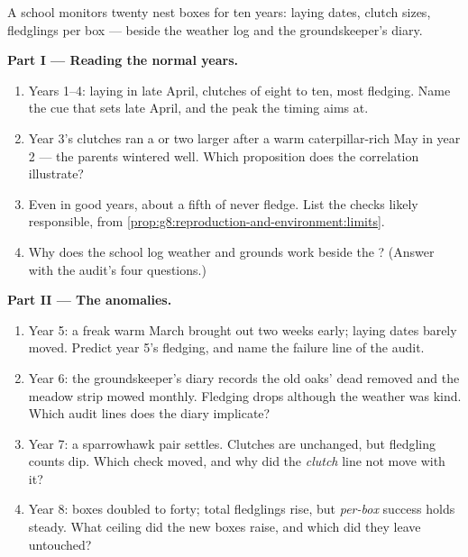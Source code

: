 \begin{problem}\label{pb:g8:reproduction-and-environment:1}
A school monitors twenty nest boxes for ten years:
laying dates, clutch sizes, fledglings per box --- beside
the weather log and the groundskeeper's diary.

\medskip\noindent\textbf{Part I --- Reading the normal
years.}
\begin{enumerate}
  \item Years 1--4: laying in late April, clutches of
        eight to ten, most  fledging. Name the cue
        that sets late April, and the peak the timing
        aims at.
  \item Year 3's clutches ran a  or two larger after a
        warm caterpillar-rich May in year 2 --- the
        parents wintered well. Which proposition does the
        correlation illustrate?
  \item Even in good years, about a fifth of  never
        fledge. List the checks likely responsible, from
        \cref{prop:g8:reproduction-and-environment:limits}.
  \item Why does the school log weather and grounds work
        beside the ? (Answer with the audit's four
        questions.)
\end{enumerate}

\medskip\noindent\textbf{Part II --- The anomalies.}
\begin{enumerate}[resume]
  \item Year 5: a freak warm March brought 
        out two weeks early; laying dates barely moved.
        Predict year 5's fledging, and name the failure
        line of the audit.
  \item Year 6: the groundskeeper's diary records the old
        oaks' dead  removed and the meadow strip
        mowed monthly. Fledging drops although the
        weather was kind. Which audit lines does the
        diary implicate?
  \item Year 7: a sparrowhawk pair settles. Clutches are
        unchanged, but fledgling counts dip. Which check
        moved, and why did the \emph{clutch} line not
        move with it?
  \item Year 8: boxes doubled to forty; total fledglings
        rise, but \emph{per-box} success holds steady.
        What ceiling did the new boxes raise, and which
        did they leave untouched?
\end{enumerate}


\end{problem}
